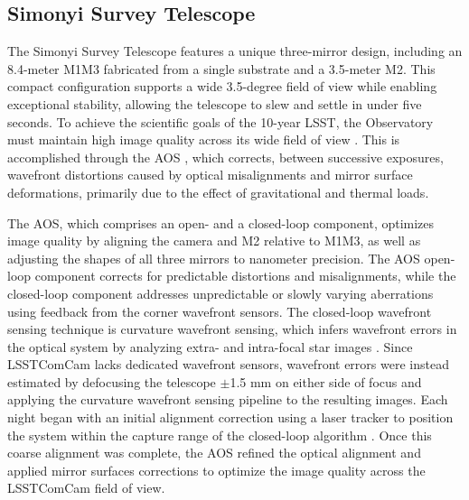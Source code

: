 
\subsection{Simonyi Survey Telescope
\label{ssec:simonyi}}

The Simonyi Survey Telescope \citep{2024SPIE13094E..09S} features a unique three-mirror design, including an 8.4-meter \gls{M1M3} fabricated from a single substrate and a 3.5-meter \gls{M2}.
This compact \gls{configuration} supports a wide 3.5-degree field of view while enabling exceptional stability, allowing the telescope to slew and settle in under five seconds.
To achieve the scientific goals of the 10-year \gls{LSST}, the Observatory must maintain high image quality across its wide field of view \citep{2008arXiv0805.2366I}.
This is accomplished through the \gls{AOS} \citep{2015ApOpt..54.9045X,MegiasHomar_2024}, which corrects, between successive exposures, wavefront distortions caused by optical misalignments and mirror surface deformations, primarily due to the effect of gravitational and thermal loads.

The \gls{AOS}, which comprises an open- and a closed-loop component, optimizes image quality by aligning the camera and \gls{M2} relative to \gls{M1M3}, as well as adjusting the shapes of all three mirrors to nanometer precision.
The \gls{AOS} open-loop component corrects for predictable distortions and misalignments, while the closed-loop component addresses unpredictable or slowly varying aberrations using feedback from the corner wavefront sensors.
The closed-loop wavefront sensing technique is curvature wavefront sensing, which infers wavefront errors in the optical system by analyzing extra- and intra-focal star images \citep{2023aoel.confE..67T}.
Since \gls{LSSTComCam} lacks dedicated wavefront sensors, wavefront errors were instead estimated by defocusing the telescope $\pm$1.5 mm on either side of focus and applying the curvature wavefront sensing pipeline to the resulting images.
Each night began with an initial alignment correction using a laser tracker to position the system within the capture range of the closed-loop \gls{algorithm} \citep{10.1117/12.3019031}.
Once this coarse alignment was complete, the \gls{AOS} refined the optical alignment and applied mirror surfaces corrections to optimize the image quality across the \gls{LSSTComCam} field of view.

